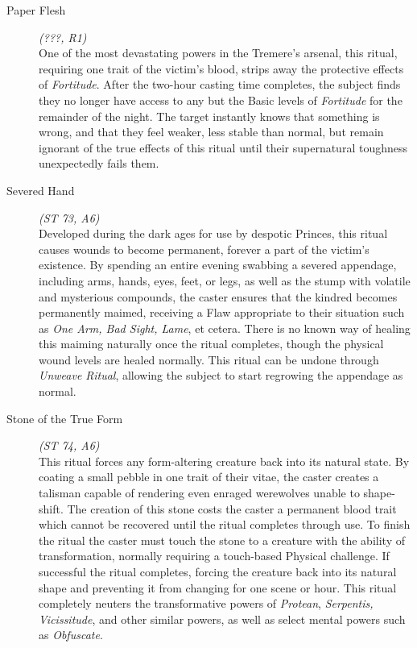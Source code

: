 \begin{description}
	\item[Paper Flesh] \emph{(???, R1)} \hfill \\
	One of the most devastating powers in the Tremere's arsenal, this ritual, requiring one trait of the victim's blood, strips away 
	the protective effects of \emph{Fortitude}.  After the two-hour casting time completes, the subject finds they no longer have 
	access to any but the Basic levels of \emph{Fortitude} for the remainder of the night.  The target instantly knows that something 
	is wrong, and that they feel weaker, less stable than normal, but remain ignorant of the true effects of this ritual until their 
	supernatural toughness unexpectedly fails them. \\

	\item[Severed Hand] \emph{(ST 73, A6)} \hfill \\
	Developed during the dark ages for use by despotic Princes, this ritual causes wounds to become permanent, forever a part of 
	the victim's existence.  By spending an entire evening swabbing a severed appendage, including arms, hands, eyes, feet, or 
	legs, as well as the stump with volatile and mysterious compounds, the caster ensures that the kindred becomes permanently 
	maimed, receiving a Flaw appropriate to their situation such as \emph{One Arm, Bad Sight, Lame}, et cetera.  There is no 
	known way of healing this maiming naturally once the ritual completes, though the physical wound levels are healed normally.  
	This ritual can be undone through \emph{Unweave Ritual}, allowing the subject to start regrowing the appendage as normal. \\

	\item[Stone of the True Form] \emph{(ST 74, A6)} \hfill \\
	This ritual forces any form-altering creature back into its natural state.  By coating a small pebble in one trait of their 
	vitae, the caster creates a talisman capable of rendering even enraged werewolves unable to shape-shift.  The creation of 
	this stone costs the caster a permanent blood trait which cannot be recovered until the ritual completes through use.  To 
	finish the ritual the caster must touch the stone to a creature with the ability of transformation, normally requiring a 
	touch-based Physical challenge.  If successful the ritual completes, forcing the creature back into its natural shape and 
	preventing it from changing for one scene or hour.  This ritual completely neuters the transformative powers of \emph{Protean}, 
	\emph{Serpentis, Vicissitude}, and other similar powers, as well as select mental powers such as \emph{Obfuscate}. \\


\end{description}
